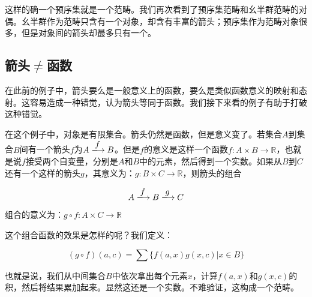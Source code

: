 \documentclass{article}
\begin{document}
这样的确一个预序集就是一个范畴。我们再次看到了预序集范畴和幺半群范畴的对偶。幺半群作为范畴只含有一个对象，却含有丰富的箭头；预序集作为范畴对象很多，但是对象间的箭头却最多只有一个。

\begin{Exercise}
\end{Exercise}

\subsection{箭头$\neq$函数}

在此前的例子中，箭头要么是一般意义上的函数，要么是类似函数意义的映射和态射。这容易造成一种错觉，认为箭头等同于函数。我们接下来看的例子有助于打破这种错觉。

\begin{example}
在这个例子中，对象是有限集合。箭头仍然是函数，但是意义变了。若集合$A$到集合$B$间有一个箭头$f$为$A \arrowto{f} B$。但是$f$的意义是这样一个函数$f: A \times B \to \mathbb{R}$，也就是说$f$接受两个自变量，分别是$A$和$B$中的元素，然后得到一个实数。如果从$B$到$C$还有一个这样的箭头$g$，其意义为：$g: B \times C \to \mathbb{R}$，则箭头的组合

\[
A \arrowto{f} B \arrowto{g} C
\]

组合的意义为：$g \circ f : A \times C \to \mathbb{R}$

这个组合函数的效果是怎样的呢？我们定义：

\[
(g \circ f)(a, c) = \sum\{f(a, x) g(x, c) | x \in B\}
\]

也就是说，我们从中间集合$B$中依次拿出每个元素$x$，计算$f(a, x)$和$g(x, c)$的积，然后将结果累加起来。显然这还是一个实数。不难验证，这构成一个范畴。
\end{example}
\end{document}
